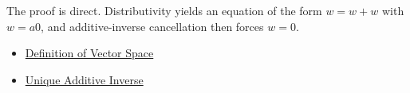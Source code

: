 \begin{remark*}
The proof is direct. Distributivity yields an equation of the form $w=w+w$ with $w=a0$, and additive-inverse cancellation then forces $w=0$.
\end{remark*}

\begin{remark*}[Dependencies]
\hfill
\begin{itemize}
  \item \hyperref[def:vector-space]{Definition of Vector Space}
  \item \hyperref[thm:unique-additive-inverse]{Unique Additive Inverse}
\end{itemize}
\end{remark*}